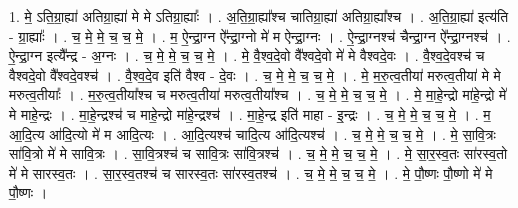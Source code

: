 \documentclass[17pt]{extarticle}
\begin{document}
1. मे॒ ऽति॒ग्रा॒ह्या॑ अतिग्रा॒ह्या॑ मे मे ऽतिग्रा॒ह्याः᳚ । . अ॒ति॒ग्रा॒ह्या᳚श्च चातिग्रा॒ह्या॑ अतिग्रा॒ह्या᳚श्च । . अ॒ति॒ग्रा॒ह्या॑ इत्य॑ति - ग्रा॒ह्याः᳚ । . च॒ मे॒ मे॒ च॒ च॒ मे॒ । . म॒ ऐ॒न्द्रा॒ग्न ऐ᳚न्द्रा॒ग्नो मे॑ म ऐन्द्रा॒ग्नः । . ऐ॒न्द्रा॒ग्नश्च॑ चैन्द्रा॒ग्न ऐ᳚न्द्रा॒ग्नश्च॑ । . ऐ॒न्द्रा॒ग्न इत्यै᳚न्द्र - अ॒ग्नः । . च॒ मे॒ मे॒ च॒ च॒ मे॒ । . मे॒ वै॒श्व॒दे॒वो वै᳚श्वदे॒वो मे॑ मे वैश्वदे॒वः । . वै॒श्व॒दे॒वश्च॑ च वैश्वदे॒वो वै᳚श्वदे॒वश्च॑ । . वै॒श्व॒दे॒व इति॑ वैश्व - दे॒वः । . च॒ मे॒ मे॒ च॒ च॒ मे॒ । . मे॒ म॒रु॒त्व॒तीया॑ मरुत्व॒तीया॑ मे मे मरुत्व॒तीयाः᳚ । . म॒रु॒त्व॒तीया᳚श्च च मरुत्व॒तीया॑ मरुत्व॒तीया᳚श्च । . च॒ मे॒ मे॒ च॒ च॒ मे॒ । . मे॒ मा॒हे॒न्द्रो मा॑हे॒न्द्रो मे॑ मे माहे॒न्द्रः । . मा॒हे॒न्द्रश्च॑ च माहे॒न्द्रो मा॑हे॒न्द्रश्च॑ । . मा॒हे॒न्द्र इति॑ माहा - इ॒न्द्रः । . च॒ मे॒ मे॒ च॒ च॒ मे॒ । . म॒ आ॒दि॒त्य आ॑दि॒त्यो मे॑ म आदि॒त्यः । . आ॒दि॒त्यश्च॑ चादि॒त्य आ॑दि॒त्यश्च॑ । . च॒ मे॒ मे॒ च॒ च॒ मे॒ । . मे॒ सा॒वि॒त्रः सा॑वि॒त्रो मे॑ मे सावि॒त्रः । . सा॒वि॒त्रश्च॑ च सावि॒त्रः सा॑वि॒त्रश्च॑ । . च॒ मे॒ मे॒ च॒ च॒ मे॒ । . मे॒ सा॒र॒स्व॒तः सा॑रस्व॒तो मे॑ मे सारस्व॒तः । . सा॒र॒स्व॒तश्च॑ च सारस्व॒तः सा॑रस्व॒तश्च॑ । . च॒ मे॒ मे॒ च॒ च॒ मे॒ । . मे॒ पौ॒ष्णः पौ॒ष्णो मे॑ मे पौ॒ष्णः । \newline
\end{document}
